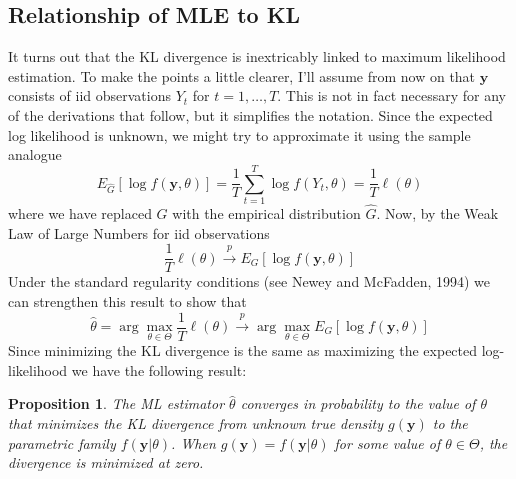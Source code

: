 \documentclass[12pt]{article}
\newtheorem{pro}{Proposition}[section]
\theoremstyle{definition}
\begin{document}
\subsection{Relationship of MLE to KL}
It turns out that the KL divergence is inextricably linked to maximum likelihood estimation. To make the points a little clearer, I'll assume from now on that $\mathbf{y}$ consists of iid observations $Y_t$ for $t = 1, \hdots, T$. This is not in fact necessary for any of the derivations that follow, but it simplifies the notation. Since the expected log likelihood is unknown, we might try to approximate it using the sample analogue
	$$E_{\widehat{G}}\left[\log{f(\textbf{y},\theta)}  \right] = \frac{1}{T}\sum_{t=1}^T \log{f(Y_t, \theta)} = \frac{1}{T}\ell(\theta)$$
where we have replaced $G$ with the empirical distribution $\widehat{G}$. Now, by the Weak Law of Large Numbers for iid observations
	$$\frac{1}{T} \ell(\theta) \overset{p}{\rightarrow} E_G\left[ \log{f(\textbf{y},\theta)} \right]$$
Under the standard regularity conditions (see Newey and McFadden, 1994) we can strengthen this result to show that
	$$\hat{\theta} = \arg \max_{\theta \in \Theta} \frac{1}{T}\ell(\theta) \overset{p}{\rightarrow} \arg \max_{\theta \in \Theta} E_G\left[ \log{f(\textbf{y},\theta)}\right]$$
Since minimizing the KL divergence is the same as maximizing the expected log-likelihood we have the following result:
\begin{pro}
The ML estimator $\hat{\theta}$ converges in probability to the value of $\theta$ that minimizes the KL divergence from unknown true density $g(\mathbf{y})$ to the parametric family $f(\mathbf{y}|\theta)$. When $g(\mathbf{y})=f(\mathbf{y}|\theta)$ for some value of $\theta \in \Theta$, the divergence is minimized at zero.
\end{pro}
\end{document}
